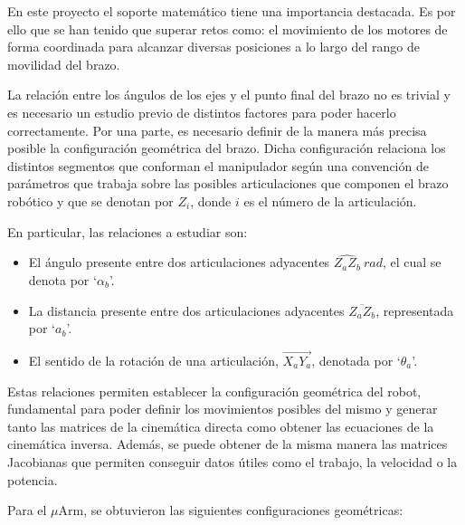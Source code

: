 En este proyecto el soporte matemático tiene una importancia destacada. Es por ello que se han tenido que superar retos como: el movimiento de los motores de forma coordinada para alcanzar
diversas posiciones a lo largo del rango de movilidad del brazo.

La relación entre los ángulos de los ejes y el punto final del brazo no es trivial y 
es necesario un estudio previo de distintos factores para poder hacerlo correctamente. 
Por una parte, es necesario definir de la manera más precisa posible la configuración 
geométrica del brazo. Dicha configuración relaciona los distintos segmentos que
conforman el manipulador según una convención de parámetros
que trabaja sobre las posibles articulaciones que componen el brazo robótico 
y que se denotan por $Z_i$, donde $i$ es el número de la articulación.

En particular, las relaciones a estudiar son:

\begin{itemize}
    \item El ángulo presente entre dos articulaciones adyacentes
          $\widehat{Z_aZ_b}~rad$, el cual se denota por `$\alpha_b$'.
    \item La distancia presente entre dos articulaciones adyacentes
          $\overline{Z_aZ_b}$, representada por `$a_b$'.
    \item El sentido de la rotación de una articulación,
          $\overrightarrow{X_aY_a}$, denotada por `$\theta_a$'.
\end{itemize}

Estas relaciones permiten establecer la configuración geométrica del robot,
fundamental para poder definir los movimientos posibles del mismo y generar tanto
las matrices de la cinemática directa como obtener las ecuaciones de la cinemática
inversa. Además, se puede obtener de la misma manera las matrices Jacobianas que
permiten conseguir datos útiles como el trabajo, la velocidad o la potencia.

Para el $\mu$Arm, se obtuvieron las siguientes configuraciones geométricas:

